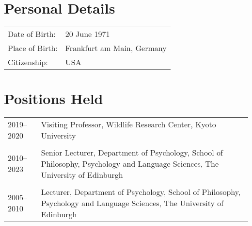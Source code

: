 \documentclass[11pt]{article}
\begin{document}

\noindent{\rule{\textwidth}{1pt}} \\


\section*{Personal Details}
\begin{tabular}{p{3cm}p{12cm}}
Date of Birth: & 20 June 1971 \\
Place of Birth: & Frankfurt am Main, Germany \\
Citizenship: & USA
\end{tabular}

\section*{Positions Held}

\begin{tabular}{p{3cm}p{12cm}}
2019--2020 & Visiting Professor, Wildlife Research Center, Kyoto University \\ \\

2010--2023 & Senior Lecturer, Department of Psychology, School of
Philosophy, Psychology and Language Sciences, The University of
Edinburgh \\ \\

2005--2010 & Lecturer, Department of Psychology, School of
Philosophy, Psychology and Language Sciences, The University of
Edinburgh 
\end{tabular}
\end{document}
